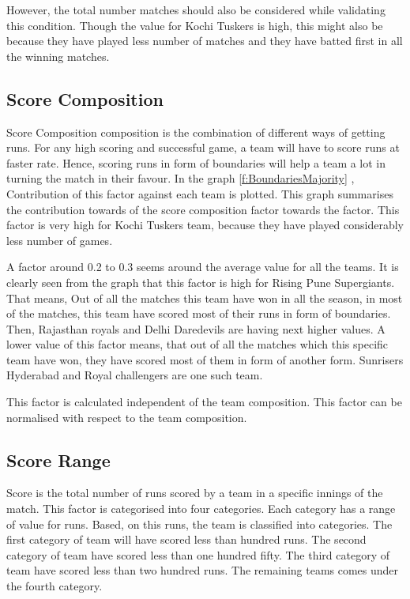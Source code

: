 \documentclass[sigconf]{acmart}
\begin{document}
However, the total number matches should also be considered while validating this condition. Though the value for Kochi Tuskers is high, this might also be because they have played less number of matches and they have batted first in all the winning matches.

\subsection{Score Composition}

Score Composition composition is the combination of different ways of getting runs. For any high scoring and successful game, a team will have to score runs at faster rate. Hence, scoring runs in form of boundaries will help a team a lot in turning the match in their favour.  In the graph \ref{f:BoundariesMajority} , Contribution of this factor against each team is plotted. This graph summarises the contribution towards of the score composition factor towards the factor. This factor is very high for Kochi Tuskers team, because they have played considerably less number of games. 


A factor around 0.2 to 0.3 seems around the average value for all the teams. It is clearly seen from the graph that this factor is high for Rising Pune Supergiants. That means, Out of all the matches this team have won in all the season, in most of the matches, this team have scored most of their runs in form of boundaries.  Then, Rajasthan royals and Delhi Daredevils are having next higher values. A lower value of this factor means, that out of all the matches which this specific team have won, they have scored most of them in form of another form. Sunrisers Hyderabad and Royal challengers are one such team.

 
This factor is calculated independent of the team composition. This factor can be normalised with respect to the team composition.

\subsection{Score Range}

Score is the total number of runs scored by a team in a specific innings of the match. This factor is categorised into four categories. Each category has a range of value for runs. Based, on this runs, the team is classified into categories. The first category of team will have scored less than hundred runs. The second category of team have scored less than one hundred fifty. The third category of team have scored less than two hundred runs. The remaining teams comes under the fourth category. 
  
\end{document}
